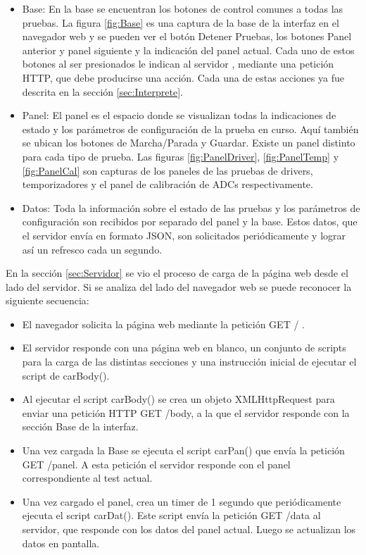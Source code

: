 \begin{itemize}
	\item Base: En la base se encuentran los botones de control comunes a todas las pruebas. La figura \ref{fig:Base} es una captura de la base de la interfaz en el navegador web y se pueden ver el botón Detener Pruebas, los botones Panel anterior y panel siguiente y la indicación del panel actual. Cada uno de estos botones al ser presionados le indican al servidor , mediante una petición HTTP, que debe producirse una acción. Cada una de estas acciones ya fue descrita en la sección \ref{sec:Interprete}.
	\item Panel: El panel es el espacio donde se visualizan todas la indicaciones de estado y los parámetros de configuración de la prueba en curso. Aquí también se ubican los botones de Marcha/Parada y Guardar. Existe un panel distinto para cada tipo de prueba. Las figuras \ref{fig:PanelDriver}, \ref{fig:PanelTemp} y \ref{fig:PanelCal} son capturas de los paneles de las pruebas de drivers, temporizadores y el panel de calibración de ADCs respectivamente.

	\item Datos: Toda la información sobre el estado de las pruebas y los parámetros de configuración son recibidos por separado del panel y la base. Estos datos, que el servidor envía en formato JSON, son solicitados periódicamente y lograr así un refresco cada un segundo.
\end{itemize}

En la sección \ref{sec:Servidor} se vio el proceso de carga de la página web desde el lado del servidor. Si se analiza del lado del navegador web se puede reconocer la siguiente secuencia:

\begin{itemize}
	\item El navegador solicita la página web mediante la petición GET / .
	\item El servidor responde con una página web en blanco, un conjunto de scripts para la carga de las distintas secciones y una instrucción inicial de ejecutar el script de carBody().
	\item Al ejecutar el script carBody() se crea un objeto XMLHttpRequest para enviar una petición HTTP GET /body, a la que el servidor responde con la sección Base de la interfaz.
	\item Una vez cargada la Base se ejecuta el script carPan() que envía la petición GET /panel. A esta petición el servidor responde con el panel correspondiente al test actual.
	\item Una vez cargado el panel, crea un timer de 1 segundo que periódicamente ejecuta el script carDat(). Este script envía la petición GET /data al servidor, que responde con los datos del panel actual. Luego se actualizan los datos en pantalla.
\end{itemize}

